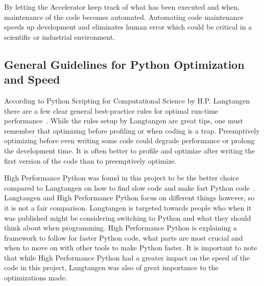 \documentclass[12pt, a4paper]{article}
\begin{document}
By letting the Accelerator keep track of what has been executed and when, maintenance of the code becomes automated.
Automating code maintenance speeds up development and eliminates human error which could be critical in a scientific or industrial environment.

\subsection{General Guidelines for Python Optimization and Speed}

According to Python Scripting for Computational Science by H.P. Langtangen there are a few clear general best-practice rules for optimal run-time performance~\cite{pythonBook}.
While the rules setup by Langtangen are great tips, one must remember that optimizing before profiling or when coding is a trap.
Preemptively optimizing before even writing some code could degrade performance or prolong the development time.
It is often better to profile and optimize after writing the first version of the code than to preemptively optimize.

High Performance Python was found in this project to be the better choice compared to Langtangen on how to find slow code and make fast Python code~\cite{oreilly}.
Langtangen and High Performance Python focus on different things however, so it is not a fair comparison.
Langtangen is targeted towards people who when it was published might be considering switching to Python and what they should think about when programming.
High Performance Python is explaining a framework to follow for faster Python code, what parts are most crucial and when to move on with other tools to make Python faster.
It is important to note that while High Performance Python had a greater impact on the speed of the code in this project, Langtangen was also of great importance to the optimizations made.
\end{document}
